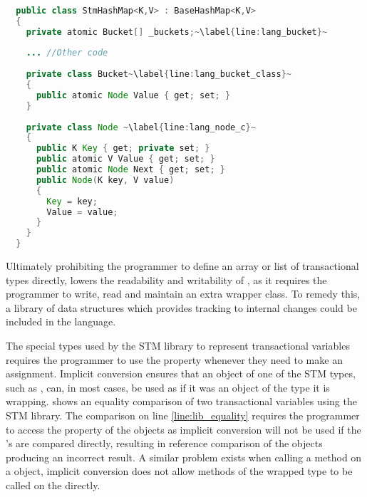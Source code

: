 \begin{lstlisting}[float,label=lst:lang_Buckets,
  caption={HashMap Buckets Array - \stmname},
  language=Java,  
  showspaces=false,
  showtabs=false,
  breaklines=true,
  showstringspaces=false,
  breakatwhitespace=true,
  escapechar=~,
  commentstyle=\color{greencomments},
  keywordstyle=\color{bluekeywords},
  stringstyle=\color{redstrings},
  morekeywords={atomic, retry, orelse, var, get, set, ref, out}]  % Start your code-block
  
  public class StmHashMap<K,V> : BaseHashMap<K,V>
  {
    private atomic Bucket[] _buckets;~\label{line:lang_bucket}~
  
    ... //Other code
    
    private class Bucket~\label{line:lang_bucket_class}~
    {
      public atomic Node Value { get; set; }
    }
  
    private class Node ~\label{line:lang_node_c}~
    {
      public K Key { get; private set; }
      public atomic V Value { get; set; }
      public atomic Node Next { get; set; }
      public Node(K key, V value)
      {
        Key = key;
        Value = value;
      }
    }
  }
\end{lstlisting}

Ultimately prohibiting the programmer to define an array or list of transactional types directly, lowers the readability and writability of \stmname, as it requires the programmer to write, read and maintain an extra wrapper class. To remedy this, a library of data structures which provides tracking to internal changes could be included in the language. 

The special types used by the \ac{STM} library to represent transactional variables requires the programmer to use the  property whenever they need to make an assignment. Implicit conversion ensures that an object of one of the \ac{STM} types, such as , can, in most cases, be used as if it was an object of the type it is wrapping.  shows an equality comparison of two transactional variables using the \ac{STM} library. The comparison on line \ref{line:lib_equality} requires the programmer to access the  property of the  objects as implicit conversion will not be used if the 's are compared directly, resulting in reference comparison of the  objects producing an incorrect result. A similar problem exists when calling a method on a  object, implicit conversion does not allow methods of the wrapped type to be called on the  directly. 

